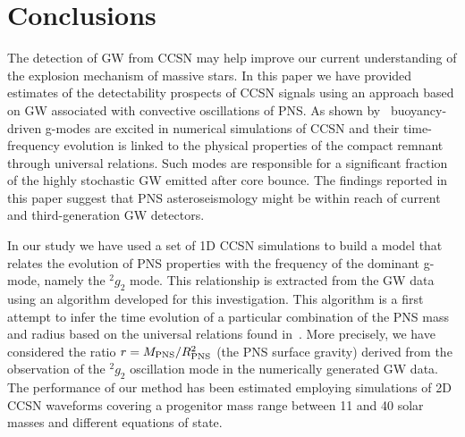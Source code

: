 \section{Conclusions}
\label{sec:conclusion}

The detection of GW from CCSN may help improve our current understanding of the explosion mechanism of massive stars.  
In this paper we have provided estimates of the detectability prospects of CCSN signals using an approach based on GW associated with convective oscillations of PNS. As shown by~\cite{Torres:2019b} buoyancy-driven g-modes are excited in numerical simulations of CCSN and their time-frequency evolution is linked to the physical properties of the compact remnant through universal relations. Such modes are responsible for a significant fraction of the highly stochastic GW emitted after core bounce. The findings reported in this paper suggest that PNS asteroseismology might be within reach of current and third-generation GW detectors.

In our study we have used a set of 1D CCSN simulations to build a model that relates the  evolution of PNS properties with the frequency of the dominant g-mode, namely the $\mbox{}^2g_2$ mode. This relationship is extracted from the GW data using an algorithm developed for this investigation. This algorithm is  a first attempt to infer the time evolution of a particular combination of the PNS mass and radius based on the universal relations found in~\cite{Torres:2019b}. More precisely, we have considered the ratio $r=M_{\rm PNS}/R_{\rm PNS}^2$ (the PNS surface gravity) derived from the observation of the $\mbox{}^2g_2$ oscillation mode in the numerically generated GW data. The  performance of our method has been estimated employing  simulations of 2D CCSN waveforms covering a progenitor mass range between 11 and 40 solar masses and different equations of state. 

